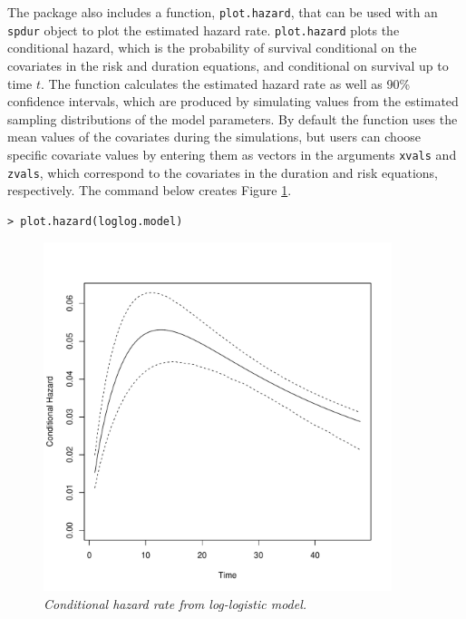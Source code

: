 \documentclass[letter]{article}
\begin{document}
The package also includes a function, \texttt{plot.hazard}, that can be used with an \texttt{spdur} object to plot the estimated hazard rate. \texttt{plot.hazard} plots the conditional hazard, which is the probability of survival conditional on the covariates in the risk and duration equations, and conditional on survival up to time $t$. The function calculates the estimated hazard rate as well as 90\% confidence intervals, which are produced by simulating values from the estimated sampling distributions of the model parameters. By default the function uses the mean values of the covariates during the simulations, but users can choose specific covariate values by entering them as vectors in the arguments \texttt{xvals} and \texttt{zvals}, which correspond to the covariates in the duration and risk equations, respectively. The command below creates Figure \ref{hazard}.
\begin{verbatim}
> plot.hazard(loglog.model)
\end{verbatim}
\begin{figure}[htbp!]
\centering
\includegraphics[width=4in]{loglog_hazard.pdf}
\caption{{\em Conditional hazard rate from log-logistic model.}} \label{hazard}
\end{figure}
\end{document}
